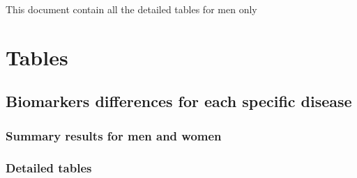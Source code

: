\documentclass[10pt, a4paper, onecolumn]{article} %
\begin{document}
\listoffigures
\listoftables
\newpage


This document contain all the detailed tables for men only

\section{Tables}

\subsection{Biomarkers differences for each specific disease}

\subsubsection{Summary results for men and women}





\subsubsection{Detailed tables}












\end{document}
